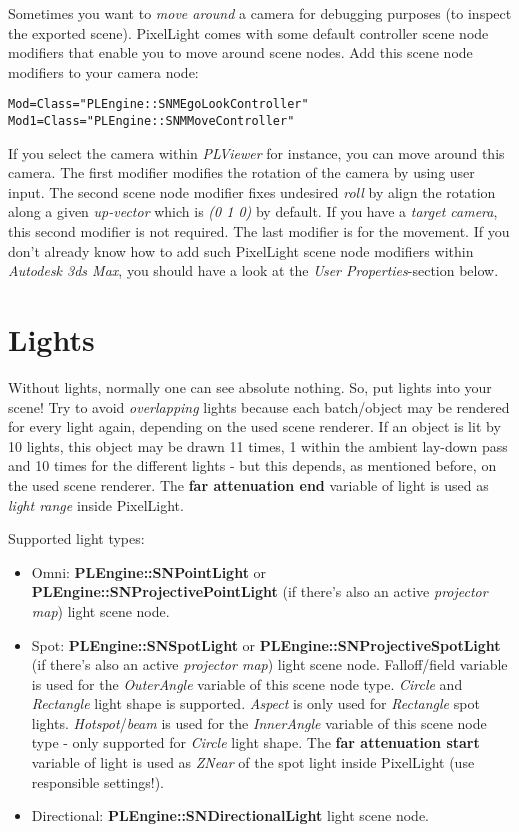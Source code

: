 Sometimes you want to \emph{move around} a camera for debugging purposes (to inspect the exported scene). PixelLight comes with some default controller scene node modifiers that enable you to move around scene nodes. Add this scene node modifiers to your camera node:

\begin{lstlisting}[caption=Free camera scene node modifiers]
Mod=Class="PLEngine::SNMEgoLookController"
Mod1=Class="PLEngine::SNMMoveController"
\end{lstlisting}

If you select the camera within \emph{PLViewer} for instance, you can move around this camera. The first modifier modifies the rotation of the camera by using user input. The second scene node modifier fixes undesired \emph{roll} by align the rotation along a given \emph{up-vector} which is \emph{(0 1 0)} by default. If you have a \emph{target camera}, this second modifier is not required. The last modifier is for the movement. If you don't already know how to add such PixelLight scene node modifiers within \emph{Autodesk 3ds Max}, you should have a look at the \emph{User Properties}-section below.




\section{Lights}
Without lights, normally one can see absolute nothing. So, put lights into your scene! Try to avoid \emph{overlapping} lights because each batch/object may be rendered for every light again, depending on the used scene renderer. If an object is lit by 10 lights, this object may be drawn 11 times, 1 within the ambient lay-down pass and 10 times for the different lights - but this depends, as mentioned before, on the used scene renderer. The \textbf{far attenuation end} variable of light is used as \emph{light range} inside PixelLight.

Supported light types:
\begin{itemize}
\item{Omni: \textbf{PLEngine::SNPointLight} or \textbf{PLEngine::SNProjectivePointLight} (if there's also an active \emph{projector map}) light scene node.}
\item{Spot: \textbf{PLEngine::SNSpotLight} or \textbf{PLEngine::SNProjectiveSpotLight} (if there's also an active \emph{projector map}) light scene node. Falloff/field variable is used for the \emph{OuterAngle} variable of this scene node type. \emph{Circle} and \emph{Rectangle} light shape is supported. \emph{Aspect} is only used for \emph{Rectangle} spot lights. \emph{Hotspot}/\emph{beam} is used for the \emph{InnerAngle} variable of this scene node type - only supported for \emph{Circle} light shape. The \textbf{far attenuation start} variable of light is used as \emph{ZNear} of the spot light inside PixelLight (use responsible settings!).}
\item{Directional: \textbf{PLEngine::SNDirectionalLight} light scene node.}
\end{itemize}

